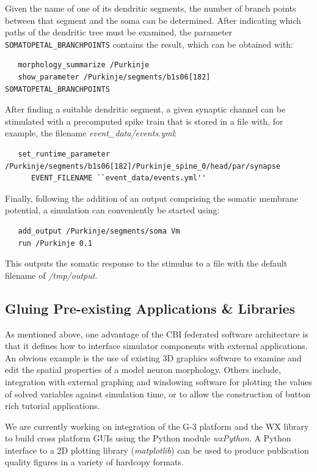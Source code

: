 \documentclass[12pt]{article}
\begin{document}
Given the name of one of its dendritic segments, the number of branch
points between that segment and the soma can be determined. After
indicating which paths of the dendritic tree must be examined, the
parameter {\tt SOMATOPETAL\_BRANCHPOINTS} contains the result, which
can be obtained with:

{\footnotesize
\begin{verbatim}
   morphology_summarize /Purkinje
   show_parameter /Purkinje/segments/b1s06[182] SOMATOPETAL_BRANCHPOINTS
\end{verbatim}
}

After finding a suitable dendritic segment, a given synaptic channel can
be stimulated with a precomputed spike train that is stored in a file
with, for example, the filename {\it event\_data/events.yml}:

{\footnotesize
\begin{verbatim}
   set_runtime_parameter /Purkinje/segments/b1s06[182]/Purkinje_spine_0/head/par/synapse
      EVENT_FILENAME ``event_data/events.yml''
\end{verbatim}
}

Finally, following the addition of an output comprising the somatic membrane potential, a simulation can conveniently be started using:

{\footnotesize
\begin{verbatim}
   add_output /Purkinje/segments/soma Vm
   run /Purkinje 0.1
\end{verbatim}
}

This outputs the somatic response to the stimulus to a file with the
default filename of {\it /tmp/output}.


\subsection{Gluing Pre-existing Applications \& Libraries}

As mentioned above, one advantage of the CBI federated software
architecture is that it defines how to interface simulator components
with external applications.  An obvious example is the use of existing
3D graphics software to examine and edit the spatial properties of a
model neuron morphology.  Others include, integration with external
graphing and windowing software for plotting the values of solved
variables against simulation time, or to allow the construction of
button rich tutorial applications.

We are currently working on integration of the G-3 platform and the WX
library to build cross platform GUIs using the Python module {\it
  wxPython}. A Python interface to a 2D plotting
library  ({\it matplotlib}) can be used to produce publication quality figures in a variety of hardcopy
formats.
\end{document}
